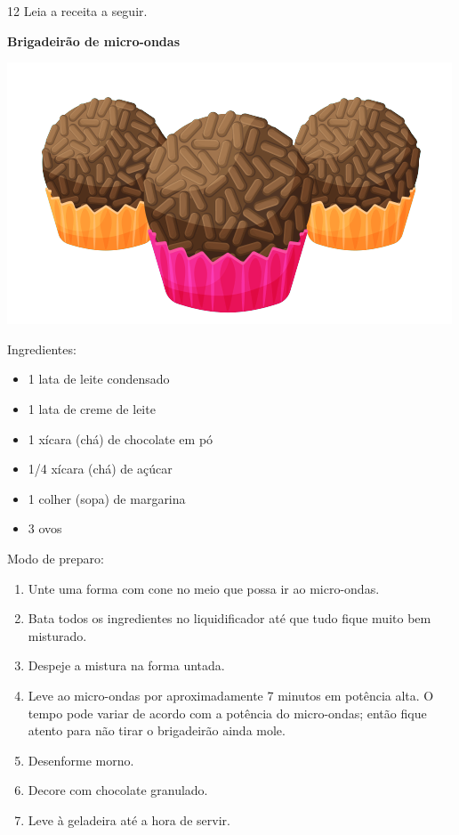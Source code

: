 \pagebreak
\num{12} Leia a receita a seguir.

\begin{myquote}
\textbf{Brigadeirão de micro-ondas}

\begin{center}
\includegraphics[width=.5\textwidth]{./media/image24e.png}
\end{center}


Ingredientes:

\begin{itemize}
\item
  1 lata de leite condensado
\item
  1 lata de creme de leite
\item
  1 xícara (chá) de chocolate em pó
\item
  1/4 xícara (chá) de açúcar
\item
  1 colher (sopa) de margarina
\item
  3 ovos
\end{itemize}

Modo de preparo:

\begin{enumerate}
\item
  Unte uma forma com cone no meio que possa ir ao micro-ondas.
\item
  Bata todos os ingredientes no liquidificador até que tudo fique muito
  bem misturado.
\item
  Despeje a mistura na forma untada.
\item
  Leve ao micro-ondas por aproximadamente 7 minutos em potência alta. O
  tempo pode variar de acordo com a potência do micro-ondas; então fique atento para
  não tirar o brigadeirão ainda mole.
\item
  Desenforme morno.
\item
  Decore com chocolate granulado.
\item
  Leve à geladeira até a hora de servir.
\end{enumerate}

\end{myquote}

